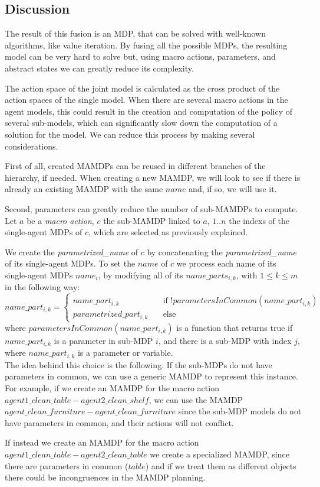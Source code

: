 \subsection{Discussion}
The result of this fusion is an MDP, that can be solved with well-known algorithms, like value iteration. By fusing all the possible MDPs, the resulting model can be  very hard to solve but, using macro actions, parameters, and abstract states we can greatly reduce its complexity. 

The action space of the joint model is calculated as the cross product of the action spaces of the single model. When there are several macro actions in the agent models, this could result in the creation and computation of the policy of several sub-models, which can significantly slow down the computation of a solution for the model. We can reduce this process by making several considerations.

First of all, created MAMDPs can be reused in different branches of the hierarchy, if needed. When creating a new MAMDP, we will look to see if there is already an existing MAMDP with the same $name$ and, if so, we will use it.

Second, parameters can greatly  reduce the number of sub-MAMDPs to compute. Let $a$ be a \textit{macro action}, $c$ the sub-MAMDP linked to $a$, $1..n$ the indexs of the single-agent MDPs of $c$, which are selected as previously explained.

 We create the \textit{parametrized\_name} of $c$ by concatenating the \textit{parametrized\_name} of its single-agent MDPs. To set the $name$ of  $c$ we process each name of its single-agent MDPs $name_i$, by modifying all of its $name\_parts_{i,k}$, with $1 \leq k \leq m$ in the following way:\\
$name\_part_{i,k}=
\begin{cases}
	name\_part_{i,k} & \quad \text{if } !parametersInCommon(name\_part_{i,k}) \\
	parametrized\_part_{i,k} & \quad \text{else}
\end{cases}$ \\
where $parametersInCommon(name\_part_{i,k})$ is a function that returns true if $name\_part_{i,k}$ is a parameter in sub-MDP $i$, and there is a sub-MDP with index $j$, where $name\_part_{i,k}$ is a parameter or variable. \\

The idea behind this choice is the following. If the sub-MDPs do not have parameters in common, we can use a generic MAMDP to represent this instance. For example, if we create an MAMDP for the macro action $agent1\_clean\_table-agent2\_clean\_shelf$, we can use the MAMDP $agent\_clean\_furniture-agent\_clean\_furniture$ since the sub-MDP models do not have parameters in common, and their actions will not conflict.

 If instead we create an MAMDP for the macro action $agent1\_clean\_table-agent2\_clean\_table$ we create a specialized MAMDP, since there are parameters in common ($table$) and if we treat them as different objects there could be incongruences in the MAMDP planning.